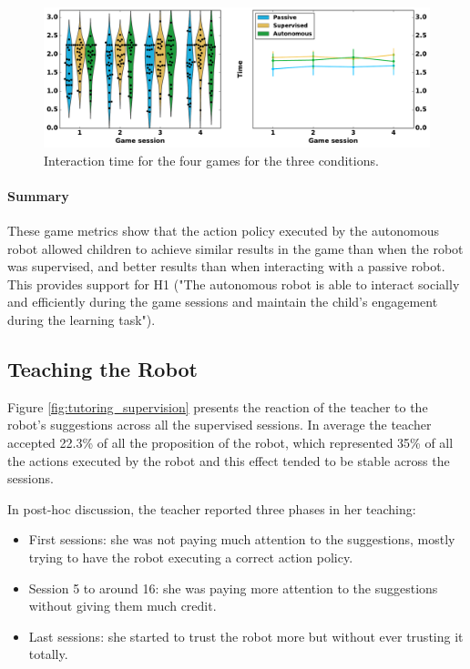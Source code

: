 \begin{figure}[ht]
	\includegraphics[width=1\linewidth]{time.pdf}
	\centering
	\caption{Interaction time for the four games for the three conditions.}
	\label{fig:tutoring_time}
\end{figure}


\paragraph{Summary}

These game metrics show that the action policy executed by the autonomous robot allowed children to achieve similar results in the game than when the robot was supervised, and better results than when interacting with a passive robot. This provides support for H1 ("The autonomous robot is able to interact socially and efficiently during the game sessions and maintain the child's engagement during the learning task"). 

\subsection{Teaching the Robot}
Figure \ref{fig:tutoring_supervision} presents the reaction of the teacher to the robot's suggestions across all the supervised sessions. In average the teacher accepted 22.3\% of all the proposition of the robot, which represented 35\% of all the actions executed by the robot and this effect tended to be stable across the sessions.

In post-hoc discussion, the teacher reported three phases in her teaching: 
\begin{itemize}
	\item First sessions: she was not paying much attention to the suggestions, mostly trying to have the robot executing a correct action policy.
	\item Session 5 to around 16: she was paying more attention to the suggestions without giving them much credit.
	\item Last sessions: she started to trust the robot more but without ever trusting it totally.
\end{itemize}

